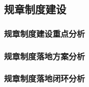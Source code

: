 \subsection{规章制度建设}

    \subsubsection{规章制度建设重点分析}

    \subsubsection{规章制度落地方案分析}

    \subsubsection{规章制度落地闭环分析}